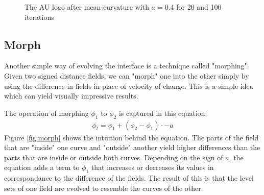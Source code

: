 \begin{figure}[h]
  \centering
  \caption{The AU logo after mean-curvature with $a=0.4$ for 20 and 100 iterations}
  \label{fig:auMean}
\end{figure}

\subsection{Morph}
Another simple way of evolving the interface is a technique called "morphing". Given two signed distance fields, we can "morph" one into the other simply by using the difference in fields in place of velocity of change. This is a simple idea which can yield visually impressive results.

The operation of morphing $\phi_1$ to $\phi_2$ is captured in this equation:
\begin{align}
\phi_t = \phi_1 + (\phi_2 - \phi_1) \cdot -a
\end{align}
Figure \vref{fig:morph} shows the intuition behind the equation. The parts of the field that are "inside" one curve and "outside" another yield higher differences than the parts that are inside or outside both curves. Depending on the sign of $a$, the equation adds a term to $\phi_1$ that increases or decreases its values in correspondance to the difference of the fields. The result of this is that the level sets of one field are evolved to resemble the curves of the other.

